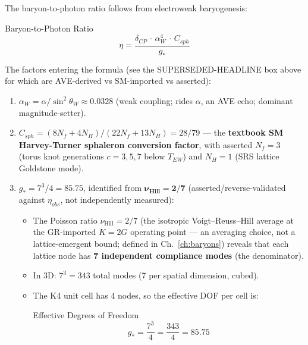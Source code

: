 The baryon-to-photon ratio follows from electroweak baryogenesis:
\begin{resultbox}{Baryon-to-Photon Ratio}
\begin{equation}
    \eta = \frac{\delta_{CP} \,\cdot\, \alpha_W^4 \,\cdot\,
    C_{sph}}{g_*}
    \label{eq:eta_baryon}
\end{equation}
\end{resultbox}

\noindent The factors entering the formula (see the SUPERSEDED-HEADLINE box
above for which are AVE-derived vs SM-imported vs asserted):

\begin{enumerate}
    \item $\alpha_W = \alpha/\sin^2\theta_W \approx 0.0328$
    (weak coupling; rides $\alpha$, an AVE echo; dominant magnitude-setter).

    \item $C_{sph} = (8N_f + 4N_H)/(22N_f + 13N_H) = 28/79$ --- the
    \textbf{textbook SM Harvey-Turner sphaleron conversion factor}, with
    asserted $N_f = 3$ (torus knot generations $c=3,5,7$ below
    $T_{EW}$) and $N_H = 1$ (SRS lattice Goldstone mode).

    \item $g_* = 7^3/4 = 85.75$, identified from
    $\boldsymbol{\nu_{\text{Hill}} = 2/7}$ (asserted/reverse-validated against
    $\eta_{obs}$, not independently measured):
    \begin{itemize}
        \item The Poisson ratio $\nu_{\text{Hill}} = 2/7$ (the isotropic
        Voigt--Reuss--Hill average at the GR-imported $K = 2G$ operating
        point --- an averaging choice, not a lattice-emergent bound;
        defined in Ch.~\ref{ch:baryons}) reveals that
        each lattice node has \textbf{7 independent compliance modes}
        (the denominator).
        \item In 3D: $7^3 = 343$ total modes (7 per spatial
        dimension, cubed).
        \item The K4 unit cell has 4 nodes, so the effective DOF
        per cell is:
        \begin{resultbox}{Effective Degrees of Freedom}
        \begin{equation}
            g_* = \frac{7^3}{4} = \frac{343}{4} = 85.75
            \label{eq:g_star_ave}
        \end{equation}
        \end{resultbox}
    \end{itemize}
\end{enumerate}

